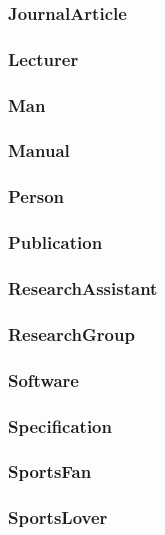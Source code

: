 \documentclass{article}
\begin{document}
\subsubsection*{JournalArticle}

\subsubsection*{Lecturer}

\subsubsection*{Man}

\subsubsection*{Manual}

\subsubsection*{Person}

\subsubsection*{Publication}

\subsubsection*{ResearchAssistant}

\subsubsection*{ResearchGroup}

\subsubsection*{Software}

\subsubsection*{Specification}

\subsubsection*{SportsFan}

\subsubsection*{SportsLover}
\end{document}
